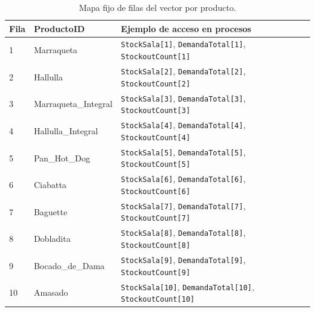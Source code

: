 \documentclass[11pt]{article}
\newcommand{\state}[1]{\texttt{#1}}
\begin{document}
\begin{table}[H]
\centering
\caption{Mapa fijo de filas del vector por producto.}
\scriptsize
\begin{tabularx}{\textwidth}{C{1.1cm}L{3.2cm}Y}
\toprule
{}
\color{white}Fila & \color{white}ProductoID & \color{white}Ejemplo de acceso en procesos \\
 & Marraqueta & \state{StockSala[1]}, \state{DemandaTotal[1]}, \state{StockoutCount[1]} \\
2 & Hallulla & \state{StockSala[2]}, \state{DemandaTotal[2]}, \state{StockoutCount[2]} \\
3 & Marraqueta\_Integral & \state{StockSala[3]}, \state{DemandaTotal[3]}, \state{StockoutCount[3]} \\
4 & Hallulla\_Integral & \state{StockSala[4]}, \state{DemandaTotal[4]}, \state{StockoutCount[4]} \\
5 & Pan\_Hot\_Dog & \state{StockSala[5]}, \state{DemandaTotal[5]}, \state{StockoutCount[5]} \\
6 & Ciabatta & \state{StockSala[6]}, \state{DemandaTotal[6]}, \state{StockoutCount[6]} \\
7 & Baguette & \state{StockSala[7]}, \state{DemandaTotal[7]}, \state{StockoutCount[7]} \\
8 & Dobladita & \state{StockSala[8]}, \state{DemandaTotal[8]}, \state{StockoutCount[8]} \\
9 & Bocado\_de\_Dama & \state{StockSala[9]}, \state{DemandaTotal[9]}, \state{StockoutCount[9]} \\
10 & Amasado & \state{StockSala[10]}, \state{DemandaTotal[10]}, \state{StockoutCount[10]} \\
\bottomrule
\end{tabularx}
\normalsize
\end{table}
\end{document}
